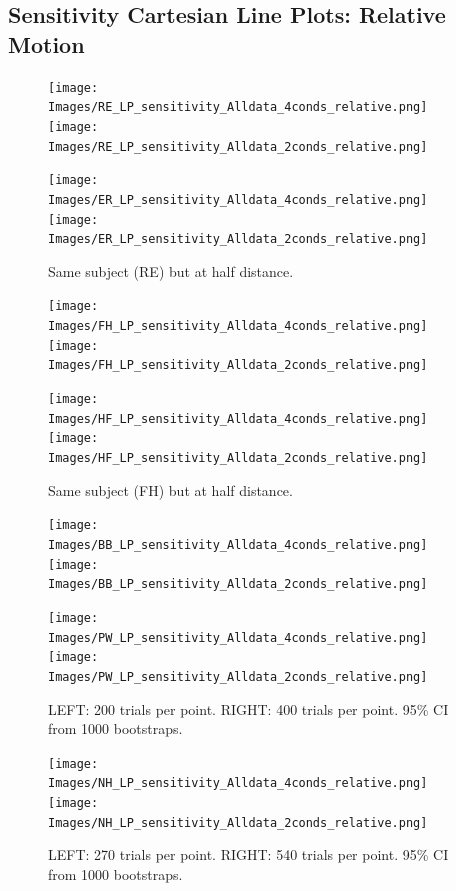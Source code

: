 \documentclass[11pt]{article} %
\begin{document}
\subsection{Sensitivity Cartesian Line Plots: Relative Motion}
\begin{figure}[H]
\centering %
\texttt{[image: Images/RE\_LP\_sensitivity\_Alldata\_4conds\_relative.png]}
\texttt{[image: Images/RE\_LP\_sensitivity\_Alldata\_2conds\_relative.png]}
\end{figure}
\begin{figure}[H]
\centering %
\texttt{[image: Images/ER\_LP\_sensitivity\_Alldata\_4conds\_relative.png]}
\texttt{[image: Images/ER\_LP\_sensitivity\_Alldata\_2conds\_relative.png]}
\caption{Same subject (RE) but at half distance.}
\end{figure}
\begin{figure}[H]
\centering %
\texttt{[image: Images/FH\_LP\_sensitivity\_Alldata\_4conds\_relative.png]}
\texttt{[image: Images/FH\_LP\_sensitivity\_Alldata\_2conds\_relative.png]}
\end{figure}
\begin{figure}[H]
\centering %
\texttt{[image: Images/HF\_LP\_sensitivity\_Alldata\_4conds\_relative.png]}
\texttt{[image: Images/HF\_LP\_sensitivity\_Alldata\_2conds\_relative.png]}
\caption{Same subject (FH) but at half distance.}
\end{figure}
\begin{figure}[H]
\centering %
\texttt{[image: Images/BB\_LP\_sensitivity\_Alldata\_4conds\_relative.png]}
\texttt{[image: Images/BB\_LP\_sensitivity\_Alldata\_2conds\_relative.png]}
\end{figure}
\begin{figure}[H]
\centering %
\texttt{[image: Images/PW\_LP\_sensitivity\_Alldata\_4conds\_relative.png]}
\texttt{[image: Images/PW\_LP\_sensitivity\_Alldata\_2conds\_relative.png]}
\caption{LEFT: 200 trials per point. RIGHT: 400 trials per point. 95\% CI from 1000 bootstraps.}
\end{figure}
\begin{figure}[H]
\centering %
\texttt{[image: Images/NH\_LP\_sensitivity\_Alldata\_4conds\_relative.png]}
\texttt{[image: Images/NH\_LP\_sensitivity\_Alldata\_2conds\_relative.png]}
\caption{LEFT: 270 trials per point. RIGHT: 540 trials per point. 95\% CI from 1000 bootstraps.}
\end{figure}
\end{document}
